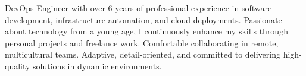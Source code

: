 

\begin{cvparagraph}

DevOps Engineer with over 6 years of professional experience in software development, infrastructure automation, and cloud deployments. Passionate about technology from a young age, I continuously enhance my skills through personal projects and freelance work. Comfortable collaborating in remote, multicultural teams. Adaptive, detail-oriented, and committed to delivering high-quality solutions in dynamic environments.\end{cvparagraph}
